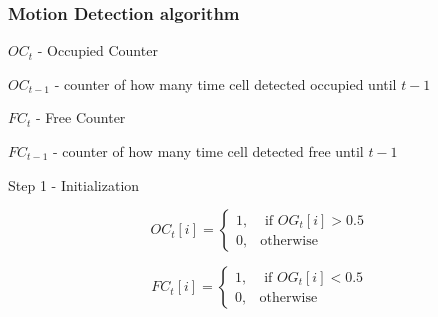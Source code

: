 \documentclass{beamer}
\begin{document}
	\begin{frame}
		\frametitle{Motion Detection algorithm}

		$OC_t$ - Occupied Counter
		
		$OC_{t-1}$ - counter of how many time cell detected occupied until $t-1$
		
		$FC_t$ - Free Counter
		
		$FC_{t-1}$ - counter of how many time cell detected free until $t-1$


		\begin{block}{Step 1 - Initialization}

			\begin{equation}
			OC_t[i] =  \begin{cases} 1, & \mbox{ if $OG_t[i] > 0.5$} \\
			                       0, & \mbox{otherwise} \end{cases}
			\end{equation}

			\begin{equation}
			FC_t[i] = \begin{cases} 1, & \mbox{ if $OG_t[i] < 0.5$} \\
			                       0, & \mbox{otherwise} \end{cases}
			\end{equation}			
		
		\end{block}

%
%		  

	\end{frame}

%		
%		
%
\end{document}
